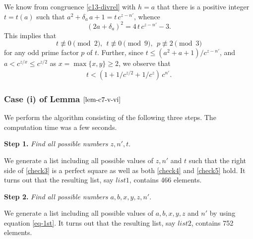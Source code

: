 \documentclass[11pt]{amsart}
\numberwithin{equation}{section}
\begin{document}
We know from congruence \eqref{c13-divrel} with $h=a$ that there is a positive integer $t=t(a)$ such that $a^2+\delta_a \, a+1=t\,c^{z-n'}$, whence
\begin{equation}\label{check3}
(2a+\delta_a)^2=4\,t\,c^{z-n'}-3.
\end{equation}
This implies that
\begin{equation}\label{check4}
t \not\equiv 0 \pmod{2}, \ \ t \not\equiv 0 \pmod{9}, \ \ p \not\equiv 2 \pmod{3}
\end{equation}
for any odd prime factor $p$ of $t$.
Further, since $t \le (a^2+a+1)/c^{z-n'}$, and $a<c^{z/x} \le c^{z/2}$ as $x=\max\{x,y\} \ge 2$, we observe that
\begin{gather}\label{check5}
t< (1+1/c^{z/2}+1/c^z)\,c^{n'}.
\end{gather}

\subsubsection{Case {\rm (i)} of Lemma $\ref{lem-c7-v-vi}$}\label{sec-case v}
We perform the algorithm consisting of the following three steps.
The computation time was a few seconds.

\vspace{0.2cm}\noindent 
{\bf Step 1.} {\it Find all possible numbers $z,n',t.$}

\vspace{0.1cm}
We generate a list including all possible values of $z,n'$ and $t$ such that the right side of \eqref{check3} is a perfect square as well as both \eqref{check4} and \eqref{check5} hold.
It turns out that the resulting list, say $list1$, contains 466 elements.


\vspace{0.2cm}\noindent 
{\bf Step 2.} {\it Find all possible numbers $a,b,x,y,z,n'.$}

\vspace{0.1cm}
We generate a list including all possible values of $a,b,x,y,z$ and $n'$ by using equation \eqref{eq-1st}.
It turns out that the resulting list, say $list2$, contains 752 elements.
\end{document}
